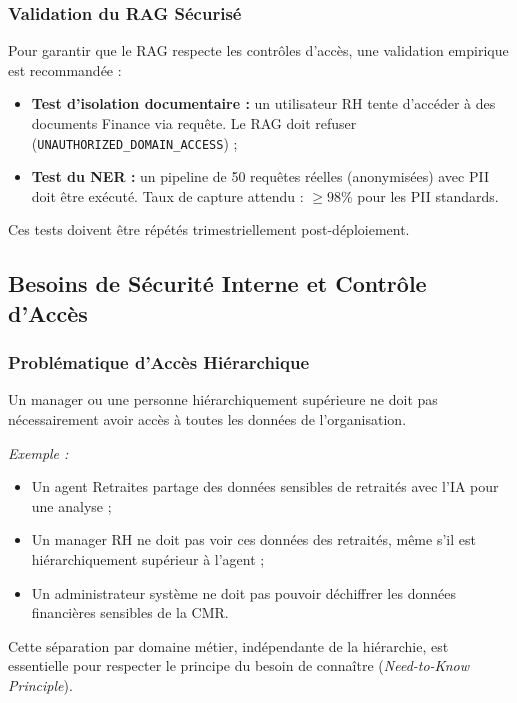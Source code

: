 \documentclass[12pt, a4paper]{report}
\begin{document}
\subsubsection{Validation du RAG Sécurisé}

Pour garantir que le RAG respecte les contrôles d'accès, une validation
empirique est recommandée :

\begin{itemize}
  \item \textbf{Test d'isolation documentaire :} un utilisateur RH tente
        d'accéder à des documents Finance via requête. Le RAG doit
        refuser (\texttt{UNAUTHORIZED\_DOMAIN\_ACCESS}) ;
  \item \textbf{Test du NER :} un pipeline de 50 requêtes réelles
        (anonymisées) avec PII doit être exécuté. Taux de capture
        attendu : \(\geq 98\%\) pour les PII standards.
\end{itemize}

Ces tests doivent être répétés trimestriellement post-déploiement.

\subsection{Besoins de Sécurité Interne et Contrôle d'Accès}

\subsubsection{Problématique d'Accès Hiérarchique}

Un manager ou une personne hiérarchiquement supérieure ne doit pas
nécessairement avoir accès à toutes les données de l'organisation.

\textit{Exemple :}
\begin{itemize}
  \item Un agent Retraites partage des données sensibles de retraités
        avec l'IA pour une analyse ;
  \item Un manager RH ne doit pas voir ces données des retraités, même
        s'il est hiérarchiquement supérieur à l'agent ;
  \item Un administrateur système ne doit pas pouvoir déchiffrer les
        données financières sensibles de la CMR.
\end{itemize}

Cette séparation par domaine métier, indépendante de la hiérarchie, est
essentielle pour respecter le principe du \og besoin de connaître \fg{}
(\textit{Need-to-Know Principle}).
\end{document}

